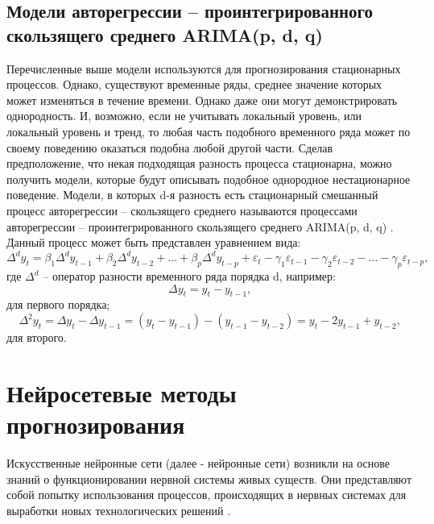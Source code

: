 \documentclass[a4paper,14pt,russian]{extreport}
\begin{document}
 \subsection{Модели авторегрессии -- проинтегрированного скользящего среднего 
 ARIMA(p, d, q)}
 Перечисленные выше модели используются для прогнозирования стационарных 
 процессов. Однако, существуют временные ряды, среднее значение которых 
 может изменяться в течение времени. Однако даже они могут демонстрировать 
 однородность. И, возможно, если не учитывать локальный уровень, или 
 локальный уровень и тренд, то любая часть подобного временного ряда может 
 по своему поведению оказаться подобна любой другой части. Сделав 
 предположение, что некая подходящая разность процесса стационарна, можно 
 получить модели, которые будут описывать подобное однородное 
 нестационарное поведение. Модели, в которых d-я разность есть стационарный 
 смешанный процесс авторегрессии -- скользящего среднего называются 
 процессами авторегрессии -- проинтегрированного скользящего среднего 
 ARIMA(p, d, q) \cite{box2008}. Данный процесс может быть представлен 
 уравнением вида:
 \begin{equation}
	\Delta^d y_t = \beta_1 \Delta^d y_{t-1} + \beta_2 \Delta^d y_{t-2} + ... 
		+ \beta_p \Delta^d y_{t-p} + \varepsilon_t  - \gamma_1 \varepsilon_{t-1} 
		- \gamma_2 \varepsilon_{t-2} - ... - \gamma_p \varepsilon_{t-p}, 
		\nonumber
\end{equation}
где $\Delta^d$ --  оператор разности временного ряда порядка d, например: 
\begin{equation}
	\Delta y_t = y_t - y_{t - 1} \text{,} \nonumber
\end{equation}
для первого порядка;
\begin{equation}
	\Delta^2 y_t = \Delta y_t - \Delta y_{t - 1} = (y_t - y_{t - 1}) - (y_{t - 1} - y_{t - 2}) 
		= y_t - 2y_{t - 1} + y_{t - 2} \text{,} \nonumber
\end{equation}
для второго.

\section{Нейросетевые методы прогнозирования}
Искусственные нейронные сети (далее - нейронные сети) возникли на основе 
знаний о функционировании нервной системы живых существ. Они 
представляют собой попытку использования процессов, происходящих в 
нервных системах для выработки новых технологических решений 
\cite{osovskiy2002}. 
\end{document}
